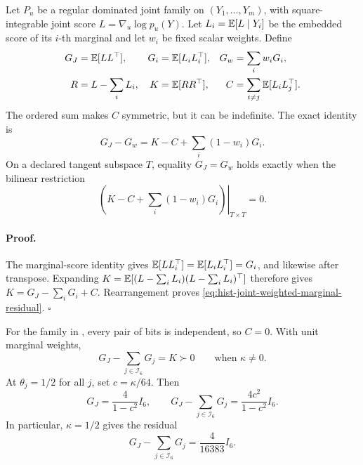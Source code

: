 Let \(P_u\) be a regular dominated joint family on
\((Y_1,\ldots,Y_m)\), with square-integrable joint score
\(L=\nabla_u\log p_u(Y)\).  Let
\(L_i=\mathbb E[L\mid Y_i]\) be the embedded score of its \(i\)-th marginal and
let \(w_i\) be fixed scalar weights.  Define
\begin{align}
G_J&=\mathbb E[LL^\top],
&G_i&=\mathbb E[L_iL_i^\top],
&G_w&=\sum_iw_iG_i,
\label{eq:hist-score-metrics}\\
R&=L-\sum_iL_i,
&K&=\mathbb E[RR^\top],
&C&=\sum_{i\ne j}\mathbb E[L_iL_j^\top].
\label{eq:hist-score-residual-tensors}
\end{align}
The ordered sum makes \(C\) symmetric, but it can be indefinite.  The exact
identity is
\begin{equation}
G_J-G_w
=K-C+\sum_i(1-w_i)G_i.
\label{eq:hist-joint-weighted-marginal-residual}
\end{equation}
On a declared tangent subspace \(T\), equality \(G_J=G_w\) holds exactly
when the bilinear restriction
\begin{equation}
\left.
\left(K-C+\sum_i(1-w_i)G_i\right)
\right|_{T\times T}=0.
\label{eq:hist-score-residual-equality-criterion}
\end{equation}

\paragraph{Proof.}
The marginal-score identity gives
\(\mathbb E[LL_i^\top]=\mathbb E[L_iL_i^\top]=G_i\), and likewise after transpose.
Expanding \(K=\mathbb E[(L-\sum_iL_i)(L-\sum_iL_i)^\top]\) therefore gives
\(K=G_J-\sum_iG_i+C\).  Rearrangement proves
\eqref{eq:hist-joint-weighted-marginal-residual}.  \(\square\)

For the family in , every pair of bits
is independent, so \(C=0\).  With unit marginal weights,
\begin{equation}
G_J-\sum_{j\in\mathcal I_6}G_j=K\succ0
\qquad\text{when }\kappa\ne0.
\label{eq:hist-parity-positive-fisher-residual}
\end{equation}
At \(\theta_j=1/2\) for all \(j\), set \(c=\kappa/64\).  Then
\begin{equation}
G_J=\frac{4}{1-c^2}I_6,
\qquad
G_J-\sum_{j\in\mathcal I_6}G_j
=\frac{4c^2}{1-c^2}I_6.
\label{eq:hist-parity-center-fisher}
\end{equation}
In particular, \(\kappa=1/2\) gives the residual
\begin{equation}
G_J-\sum_{j\in\mathcal I_6}G_j=\frac{4}{16383}I_6.
\label{eq:hist-parity-half-fisher-residual}
\end{equation}

